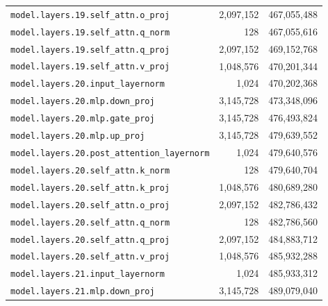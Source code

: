 \documentclass[10pt,a4paper]{article}
\theoremstyle{definition}
\begin{document}
\begin{appendices}
\begin{longtable}{p{9.5cm}rr}
\texttt{model.\allowbreak{}layers.\allowbreak{}19.\allowbreak{}self\_attn.\allowbreak{}o\_proj} & 2,097,152 & 467,055,488 \\
\texttt{model.\allowbreak{}layers.\allowbreak{}19.\allowbreak{}self\_attn.\allowbreak{}q\_norm} & 128 & 467,055,616 \\
\texttt{model.\allowbreak{}layers.\allowbreak{}19.\allowbreak{}self\_attn.\allowbreak{}q\_proj} & 2,097,152 & 469,152,768 \\
\texttt{model.\allowbreak{}layers.\allowbreak{}19.\allowbreak{}self\_attn.\allowbreak{}v\_proj} & 1,048,576 & 470,201,344 \\
\texttt{model.\allowbreak{}layers.\allowbreak{}20.\allowbreak{}input\_layernorm} & 1,024 & 470,202,368 \\
\texttt{model.\allowbreak{}layers.\allowbreak{}20.\allowbreak{}mlp.\allowbreak{}down\_proj} & 3,145,728 & 473,348,096 \\
\texttt{model.\allowbreak{}layers.\allowbreak{}20.\allowbreak{}mlp.\allowbreak{}gate\_proj} & 3,145,728 & 476,493,824 \\
\texttt{model.\allowbreak{}layers.\allowbreak{}20.\allowbreak{}mlp.\allowbreak{}up\_proj} & 3,145,728 & 479,639,552 \\
\texttt{model.\allowbreak{}layers.\allowbreak{}20.\allowbreak{}post\_attention\_layernorm} & 1,024 & 479,640,576 \\
\texttt{model.\allowbreak{}layers.\allowbreak{}20.\allowbreak{}self\_attn.\allowbreak{}k\_norm} & 128 & 479,640,704 \\
\texttt{model.\allowbreak{}layers.\allowbreak{}20.\allowbreak{}self\_attn.\allowbreak{}k\_proj} & 1,048,576 & 480,689,280 \\
\texttt{model.\allowbreak{}layers.\allowbreak{}20.\allowbreak{}self\_attn.\allowbreak{}o\_proj} & 2,097,152 & 482,786,432 \\
\texttt{model.\allowbreak{}layers.\allowbreak{}20.\allowbreak{}self\_attn.\allowbreak{}q\_norm} & 128 & 482,786,560 \\
\texttt{model.\allowbreak{}layers.\allowbreak{}20.\allowbreak{}self\_attn.\allowbreak{}q\_proj} & 2,097,152 & 484,883,712 \\
\texttt{model.\allowbreak{}layers.\allowbreak{}20.\allowbreak{}self\_attn.\allowbreak{}v\_proj} & 1,048,576 & 485,932,288 \\
\texttt{model.\allowbreak{}layers.\allowbreak{}21.\allowbreak{}input\_layernorm} & 1,024 & 485,933,312 \\
\texttt{model.\allowbreak{}layers.\allowbreak{}21.\allowbreak{}mlp.\allowbreak{}down\_proj} & 3,145,728 & 489,079,040 \\

\end{longtable}
\end{appendices}
\end{document}
